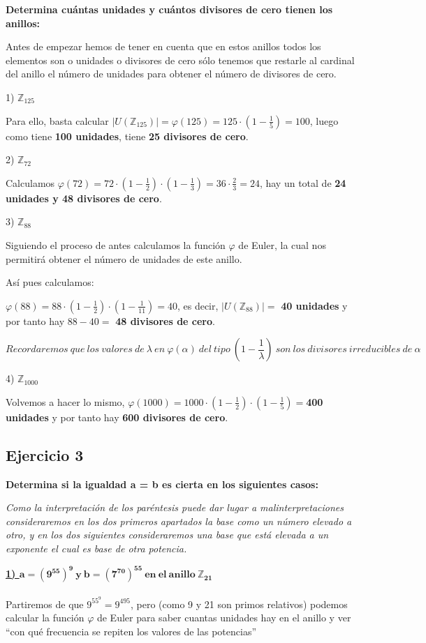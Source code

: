 \documentclass[11pt, a4paper, titlepage]{article}
\providecommand{\ent}{\mathbb{Z}}
\begin{document}
\textbf{Determina cuántas unidades y cuántos divisores de cero tienen los anillos:}


Antes de empezar hemos de tener en cuenta que en estos anillos todos los elementos son o unidades o divisores de cero sólo tenemos que restarle al cardinal del anillo el número de unidades para obtener el número de divisores de cero.

1) $\ent_{125}$

Para ello, basta calcular $|U(\ent_{125})| = \varphi(125) = 125 \cdot(1-\frac{1}{5}) = 100$, luego como tiene \textbf{100 unidades}, tiene \textbf{25 divisores de cero}.

2) $\ent_{72}$

Calculamos $\varphi(72) = 72\cdot(1-\frac{1}{2})\cdot(1-\frac{1}{3}) = 36\cdot \frac{2}{3} = 24$, hay un total de \textbf{24 unidades y 48 divisores de cero}.


3) $\ent_{88}$

Siguiendo el proceso de antes calculamos la función $\varphi$ de Euler, la cual nos permitirá obtener el número de unidades de este anillo.

Así pues calculamos:

$\varphi(88) = 88\cdot(1-\frac{1}{2})\cdot (1-\frac{1}{11}) = 40$, es decir, $|U(\ent_{88})| =$ \textbf{40 unidades} y por tanto hay $88-40=$ \textbf{48 divisores de cero}.

$$Recordaremos\ que\ los\ valores\ de\ \lambda\ en\ \varphi(\alpha)\ del\ tipo\ (1-\frac{1}{\lambda})\ son\ los\ divisores\ irreducibles\ de\ \alpha$$


4) $\ent_{1000}$

Volvemos a hacer lo mismo, $\varphi(1000) = 1000\cdot(1-\frac{1}{2})\cdot(1-\frac{1}{5}) = $\textbf{400 unidades} y por tanto hay \textbf{600 divisores de cero}.

\subsection{\LARGE{Ejercicio 3}}

\textbf{Determina si la igualdad a = b es cierta en los siguientes casos:}

\emph{Como la interpretación de los paréntesis puede dar lugar a malinterpretaciones consideraremos en los dos primeros apartados la base como un número elevado a otro, y en los dos siguientes consideraremos una base que está elevada a un exponente el cual es base de otra potencia.}

\textbf{\underline{1) $\mathbf{a = (9^{55})^9\ y\ b = (7^{70})^{55}\ en\ el\ anillo\ \ent_{21} }$}}
\\\\ 
Partiremos de que $9^{55^9} = 9^{495}$, pero (como 9 y 21 son primos relativos) podemos calcular la función $\varphi$ de Euler para saber cuantas unidades hay en el anillo y ver “con qué frecuencia se repiten los valores de las potencias”
\end{document}
